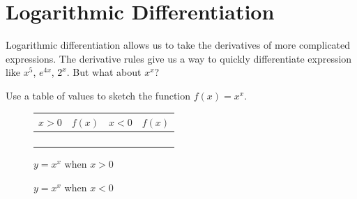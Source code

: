 \section{Logarithmic Differentiation}

Logarithmic differentiation allows us to take the derivatives of more complicated expressions. The derivative rules give us a way to quickly differentiate expression like $x^5$, $e^{4x}$, $ 2^x $. But what about $x^x$? \\

\begin{exercise}\nonumber
    Use a table of values to sketch the function $ f(x) = x^x $. \\

    \begin{figure}[H]
        \centering
        \begin{tabular}{|c|c|c|c|}
            \hline
            $ x > 0 $ & $ f(x) $ & $ x < 0 $ & $ f(x) $ \\
            \hline
                      &          &           &          \\
            \hline
                      &          &           &          \\
            \hline
                      &          &           &          \\
            \hline
                      &          &           &          \\
            \hline
        \end{tabular}
    \end{figure}

    \begin{figure}[H]
        \centering
        \caption{$ y = x ^ x $ when $ x > 0 $}
    \end{figure}

    \begin{figure}[H]
        \centering
        \caption{$ y = x ^ x $ when $ x < 0 $}
    \end{figure}
\end{exercise}


